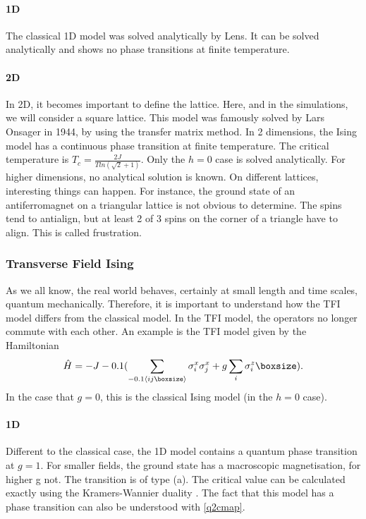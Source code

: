 \paragraph{1D}

The classical 1D model was solved analytically by Lens. It can be solved analytically and shows no phase transitions  at finite temperature.

\paragraph{2D}

In 2D, it becomes important to define the lattice. Here, and in the simulations, we will consider a square lattice. This model was famously solved by Lars Onsager in 1944, by using the transfer matrix method. In 2 dimensions, the Ising model has a continuous phase transition at finite temperature. The critical temperature is $T_c = \frac{2 J}{T ln( \sqrt{2}+1)}$. Only the $h=0$ case is solved analytically. For higher dimensions, no analytical solution is known. On different lattices, interesting things can happen. For instance, the ground state of an antiferromagnet on a triangular lattice is not obvious to determine. The spins tend to antialign, but at least 2 of 3 spins on the corner of a triangle have to align. This is called frustration.

\subsubsection{Transverse Field Ising}

As we all know, the real world behaves, certainly at small length and time scales, quantum mechanically. Therefore, it is important to understand how the \acrfull{TFI} model differs from the classical model. In the \Gls{TFI} model, the operators no longer commute with each other. An example is the \Gls{TFI} model given by the  Hamiltonian
\begin{equation}
  \hat{H} = -J \left (  \sum_{\Braket{i j }} \sigma^x_i \sigma^x_j + g \sum_i \sigma^z_i \right ) .
\end{equation}
In the case that $g=0$, this is the classical Ising model (in the $h=0$ case).

\paragraph{1D}
Different to the classical case, the 1D model contains a quantum phase transition at $g=1$. For smaller fields, the ground state has a macroscopic magnetisation, for higher g not. The transition is of type  (a). The critical value can be calculated exactly using the Kramers-Wannier duality \cite{Radicevic2018}. The fact that this model has a phase transition can also be understood with \cref{q2cmap}.

